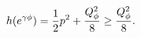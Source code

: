 \begin{equation}
h(e^{\gamma\phi})={1\over 2}p^2+{Q_{\phi}^2\over 8}\ge {Q_{\phi}^2\over 8}.
\end{equation}

